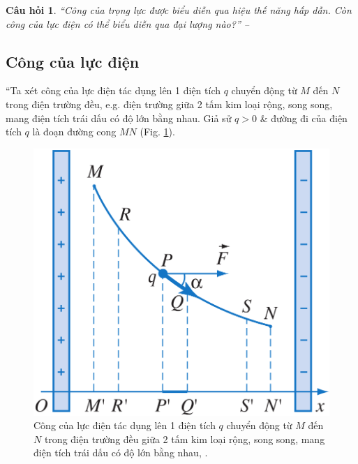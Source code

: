 \documentclass[oneside]{book}
\numberwithin{equation}{section}
\newtheorem{cauhoi}{Câu hỏi}[section]
\begin{document}
\begin{cauhoi}
	``Công của trọng lực được biểu diễn qua hiệu thế năng hấp dẫn. Còn công của lực điện có thể biểu diễn qua đại lượng nào?'' -- \cite[p. 19]{SGK_Vat_Ly_11_nang_cao}
\end{cauhoi}

\subsection{Công của lực điện}
``Ta xét công của lực điện tác dụng lên 1 điện tích $q$ chuyển động từ $M$ đến $N$ trong điện trường đều, e.g. điện trường giữa 2 tấm kim loại rộng, song song, mang điện tích trái dấu có độ lớn bằng nhau. Giả sử $q > 0$ \& đường đi của điện tích $q$ là đoạn đường cong $MN$ (Fig. \ref{fig:cong luc dien}).

\begin{figure}[H]
	\centering
	\includegraphics[scale=0.15]{cong_luc_dien}
	\caption{Công của lực điện tác dụng lên 1 điện tích $q$ chuyển động từ $M$ đến $N$ trong điện trường đều giữa 2 tấm kim loại rộng, song song, mang điện tích trái dấu có độ lớn bằng nhau, \cite[Hình 4.1, p. 19]{SGK_Vat_Ly_11_nang_cao}.}
	\label{fig:cong luc dien}
\end{figure}
\end{document}
